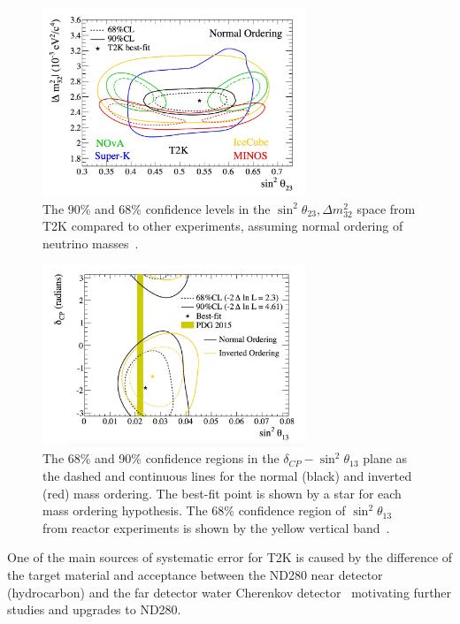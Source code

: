 \begin{figure}[h!]
\centering
  \centering
\includegraphics[width=0.7\textwidth]{figures/t2k2.jpeg}
\vspace{2mm}
\caption{The 90\% and 68\% confidence levels in the $\sin^2 \theta_{23}, \Delta m^2_{32}$ space from T2K compared to other experiments, assuming normal ordering of neutrino masses~\cite{T2Kfigures}.}
\label{fig:T2K23}
\end{figure}

\begin{figure}[h!]
\centering
  \centering
\includegraphics[width=0.7\textwidth]{figures/t2kfix.jpeg}
\vspace{2mm}
\caption{The 68\% and 90\% confidence regions in the $\delta_{CP} - \sin^2 \theta_{13}$ plane as the dashed and continuous lines for the normal (black) and inverted (red) mass ordering. The best-fit point is shown by a star for each mass ordering hypothesis. The 68\% confidence region of $\sin^2 \theta_{13}$ from reactor experiments is shown by the yellow vertical band~\cite{108Abe}.}
\label{fig:T2K12}
\end{figure}

One of the main sources of systematic error for T2K is caused by the difference of the target material and acceptance between the ND280 near detector (hydrocarbon) and the far detector water Cherenkov detector~\cite{T2Kpaper} motivating further studies and upgrades to ND280.

